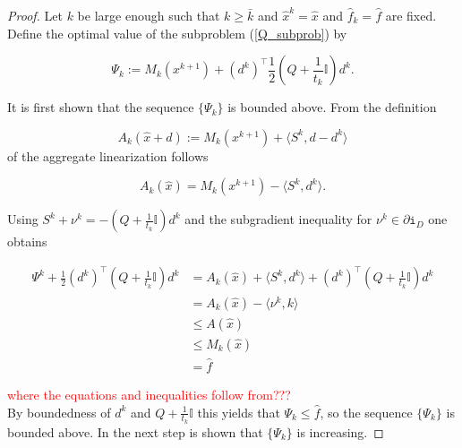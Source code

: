 \begin{proof}
	Let \(k\) be large enough such that \(k \geq \bar{k}\) and \(\hat{x}^k = \hat{x}\) and \(\hat{f}_k=\hat{f}\) are fixed.
	Define the optimal value of the subproblem (\ref{Q_subprob}) by 
	
	\begin{equation}
		\Psi_k := M_k(x^{k+1})+\left(d^k\right)^{\top}\frac{1}{2}\left(Q+\frac{1}{t_k}\mathbb{I}\right)d^k.
		\label{Psi}
	\end{equation}
	
	It is first shown that the sequence \(\{\Psi_k\}\) is bounded above.
	From the definition

\begin{equation}	
	A_k(\hat{x}+d) := M_k(x^{k+1})+\langle S^k,d-d^k\rangle
	\label{Noll_agg_lin}
\end{equation}
	of the aggregate linearization follows
	
	\begin{equation}
		A_k(\hat{x}) = M_k(x^{k+1})-\langle S^k,d^k \rangle.
	\end{equation}
	
	Using \(S^k+\nu^k = -\left(Q+\frac{1}{t_k}\mathbb{I}\right)d^k\) and the subgradient inequality for \(\nu^k \in \partial \mathtt{i}_{D}\) one obtains
	
	\begin{align*}
		\Psi^k+\frac{1}{2}\left(d^{k}\right)^{\top}\left(Q+\frac{1}{t_k}\mathbb{I}\right)d^k &= A_k(\hat{x})+\langle S^k,d^k\rangle + \left(d^{k}\right)^{\top}\left(Q+\frac{1}{t_k}\mathbb{I}\right)d^k \\
		&= A_k(\hat{x})-\langle \nu^k,k \rangle \\
		&\leq A(\hat{x}) \\
		&\leq M_k(\hat{x}) \\
		& = \hat{f}
	\end{align*}
	
	\textcolor{red}{where the equations and inequalities follow from???}\\
	By boundedness of \(d^k\) and \(Q+\frac{1}{t_k}\mathbb{I}\) this yields that \(\Psi_k \leq \hat{f}\), so the sequence \(\{\Psi_k\}\) is bounded above.
	In the next step is shown that \(\{\Psi_k\}\) is increasing.
	

\end{proof}
